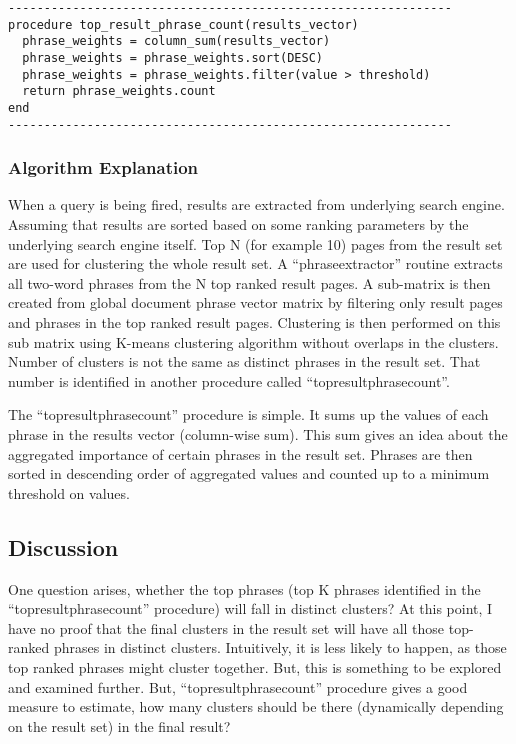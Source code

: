 \documentclass[letterpaper,12pt]{article}
\begin{document}
\begin{verbatim}
--------------------------------------------------------------
procedure top_result_phrase_count(results_vector)
  phrase_weights = column_sum(results_vector)
  phrase_weights = phrase_weights.sort(DESC)
  phrase_weights = phrase_weights.filter(value > threshold)
  return phrase_weights.count
end
--------------------------------------------------------------
\end{verbatim}

\subsubsection{Algorithm Explanation}

When a query is being fired, results are extracted from underlying search engine. Assuming that results are sorted based on some ranking parameters by the underlying search engine itself. Top N (for example 10) pages from the result set are used for clustering the whole result set. A ``phrase\textunderscore extractor'' routine extracts all two-word phrases from the N top ranked result pages. A sub-matrix is then created from global document phrase vector matrix by filtering only result pages and phrases in the top ranked result pages. Clustering is then performed on this sub matrix using K-means clustering algorithm without overlaps in the clusters. Number of clusters is not the same as distinct phrases in the result set. That number is identified in another procedure called ``top\textunderscore result\textunderscore phrase\textunderscore count''.

The ``top\textunderscore result\textunderscore phrase\textunderscore count'' procedure is simple. It sums up the values of each phrase in the results vector (column-wise sum). This sum gives an idea about the aggregated importance of certain phrases in the result set. Phrases are then sorted in descending order of aggregated values and counted up to a minimum threshold on values.


\subsection{Discussion}

One question arises, whether the top phrases (top K phrases identified in the ``top\textunderscore result\textunderscore phrase\textunderscore count'' procedure) will fall in distinct clusters? At this point, I have no proof that the final clusters in the result set will have all those top-ranked phrases in distinct clusters. Intuitively, it is less likely to happen, as those top ranked phrases might cluster together. But, this is something to be explored and examined further. But, ``top\textunderscore result\textunderscore phrase\textunderscore count'' procedure gives a good measure to estimate, how many clusters should be there (dynamically depending on the result set) in the final result?
\end{document}
